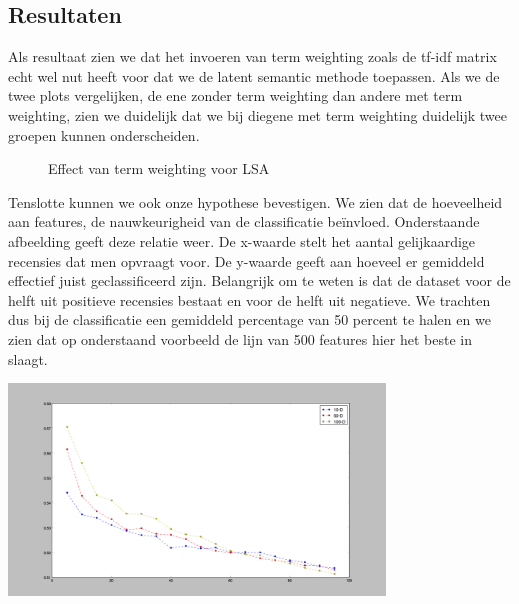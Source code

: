\subsection{Resultaten}\label{Resultaten}

Als resultaat zien we dat het invoeren van term weighting zoals de tf-idf matrix echt wel nut heeft voor dat we de latent semantic methode toepassen.
Als we de twee plots vergelijken, de ene zonder term weighting dan andere met term weighting, zien we duidelijk dat we bij diegene met term weighting duidelijk twee groepen kunnen onderscheiden.

\begin{figure}%
    \centering
    \qquad
    \caption{Effect van term weighting voor LSA}%
    \label{fig:example}%
\end{figure}
%
Tenslotte kunnen we ook onze hypothese bevestigen. We zien dat de hoeveelheid aan features, de nauwkeurigheid van de classificatie be\"invloed. Onderstaande afbeelding geeft deze relatie weer. De x-waarde stelt het aantal gelijkaardige recensies dat men opvraagt voor. De y-waarde geeft aan hoeveel er gemiddeld effectief juist geclassificeerd zijn. Belangrijk om te weten is dat de dataset voor de helft uit positieve recensies bestaat en voor de helft uit negatieve. We trachten dus bij de classificatie een gemiddeld percentage van 50 percent te halen en we zien dat op onderstaand voorbeeld de lijn van 500 features hier het beste in slaagt.


\begin{center}
  \includegraphics[width=10cm]{experiment_3}
\end{center}